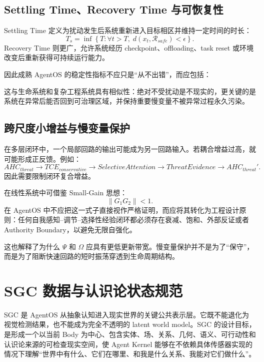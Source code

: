 \section{Settling Time、Recovery Time 与可恢复性}

Settling Time 定义为扰动发生后系统重新进入目标相区并维持一定时间的时长：
\[
T_s
=
\inf\left\{
T:
\forall t>T,\;
d(x_t,\mathcal R_{safe})<\epsilon
\right\}.
\]
Recovery Time 则更广，允许系统经历 checkpoint、offloading、task reset 或环境改变后重新获得可持续运行能力。

因此成熟 AgentOS 的稳定性指标不应只是“从不出错”，而应包括：
\begin{statementbox}
\centering
{}
\end{statementbox}

这与生命系统和复杂工程系统具有相似性：绝对不受扰动是不现实的，更关键的是系统在异常后能否回到可治理区域，并保持重要慢变量不被异常过程永久污染。

\section{跨尺度小增益与慢变量保护}

在多层闭环中，一个局部回路的输出可能成为另一回路输入。若耦合增益过高，就可能形成正反馈。例如：
\[
AHC_{threat}
\rightarrow
TCE_{conservative}
\rightarrow
SelectiveAttention
\rightarrow
ThreatEvidence
\rightarrow
AHC_{threat}'.
\]
因此需要限制闭环复合增益。

在线性系统中可借鉴 Small-Gain 思想：
\[
\|G_1G_2\|<1.
\]
在 AgentOS 中不应把这一式子直接视作严格证明，而应将其转化为工程设计原则：任何自我感知--调节--选择性经验闭环都必须存在衰减、饱和、外部反证或者 Authority Boundary，以避免无限自强化。

这也解释了为什么 $\Psi$ 和 $\Omega$ 应具有更低更新带宽。慢变量保护并不是为了“保守”，而是为了阻断快速回路的短时振荡穿透到生命周期结构。


\chapter{SGC 数据与认识论状态规范}
\label{app:sgc}

\begin{chapterlead}
SGC 是 AgentOS 从抽象认知进入现实世界的关键公共表示层。它既不能退化为视觉检测结果，也不能成为完全不透明的 latent world model。SGC 的设计目标，是形成一个以当前 Body 为中心、包含实体、场、关系、几何、语义、可行动性和认识论来源的可检查现实空间，使 Agent Kernel 能够在不依赖具体传感器实现的情况下理解“世界中有什么、它们在哪里、和我是什么关系、我能对它们做什么”。
\end{chapterlead}

